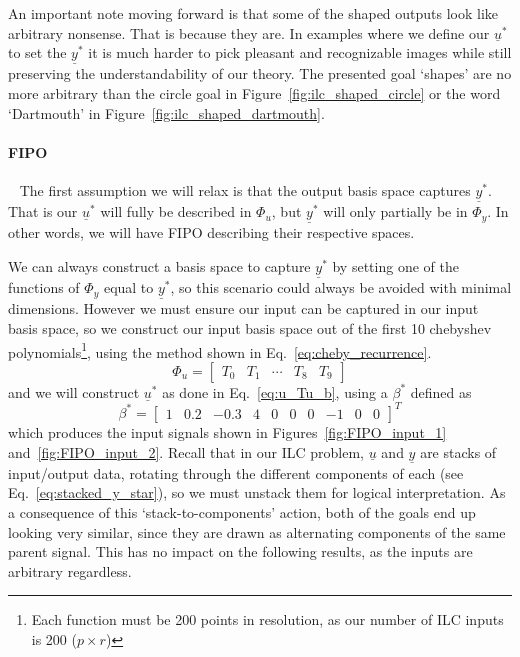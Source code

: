 An important note moving forward is that some of the shaped outputs look like arbitrary nonsense. That is because they are. In examples where we define our $\underline{u}^\ast$ to set the $\underline{y}^\ast$ it is much harder to pick pleasant and recognizable images while still preserving the understandability of our theory. The presented goal `shapes' are no more arbitrary than the circle goal in Figure~\ref{fig:ilc_shaped_circle} or the word `Dartmouth' in Figure~\ref{fig:ilc_shaped_dartmouth}. 

\FloatBarrier\paragraph{{FIPO}}
~\label{par:fipo}
The first assumption we will relax is that the output basis space captures $\underline{y}^\ast$. That is our $\underline{u}^\ast$ will fully be described in $\Phi_u$, but $\underline{y}^\ast$ will only partially be in $\Phi_y$. In other words, we will have \ac{FIPO} describing their respective spaces.

We can always construct a basis space to capture $\underline{y}^\ast$ by setting one of the functions of $\Phi_y$ equal to $\underline{y}^\ast$, so this scenario could always be avoided with minimal dimensions. However we must ensure our input can be captured in our input basis space, so we construct our input basis space out of the first 10 chebyshev polynomials\footnote{Each function must be 200 points in resolution,  as our number of ILC inputs is 200 ($p \times r$)}, using the method shown in Eq.~\ref{eq:cheby_recurrence}.
\begin{equation}
    \Phi_u = 
    \begin{bmatrix}
        T_0 & T_1 & \cdots & T_8 & T_9
    \end{bmatrix}
    \label{eq:Tu_in_cheby}
\end{equation}
and we will construct $\underline{u}^\ast$ as done in Eq.~\ref{eq:u_Tu_b}, using a $\beta^\ast$ defined as
\begin{equation}
    \beta^\ast = {\begin{bmatrix}1 & 0.2 & -0.3 & 4 & 0 & 0 & 0 & -1 & 0 & 0\end{bmatrix}}^T
    \label{eq:beta_star_in_basis}
\end{equation}
which produces the input signals shown in Figures~\ref{fig:FIPO_input_1} and~\ref{fig:FIPO_input_2}. Recall that in our ILC problem, $\underline{u}$ and $\underline{y}$ are stacks of input/output data, rotating through the different components of each (see Eq.~\ref{eq:stacked_y_star}), so we must unstack them for logical interpretation. As a consequence of this `stack-to-components' action, both of the goals end up looking very similar, since they are drawn as alternating components of the same parent signal. This has no impact on the following results, as the inputs are arbitrary regardless.

